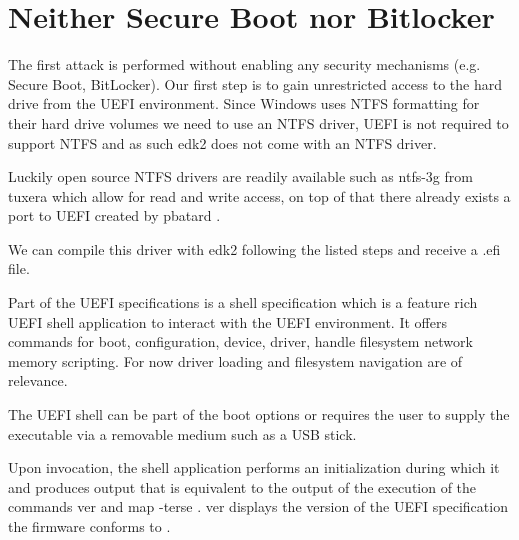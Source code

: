 
\section{Neither Secure Boot nor Bitlocker}
The first attack is performed without enabling any security mechanisms (e.g. Secure Boot, BitLocker). Our first step is to gain unrestricted access to the hard drive from the UEFI environment.
Since Windows uses NTFS formatting for their hard drive volumes we need to use an NTFS driver, UEFI is not required to support NTFS and as such edk2 does not come with an NTFS driver.

Luckily open source NTFS drivers are readily available such as ntfs-3g from tuxera \cite{ntfs-3g} which allow for read and write access, on top of that there already exists a port to UEFI created by pbatard \cite{ntfs-3g-uefi}.

We can compile this driver with edk2 following the listed steps and receive a .efi file.

Part of the UEFI specifications is a shell specification which is a feature rich UEFI shell application to interact with the UEFI environment.
It offers commands for
boot,
configuration,
device, driver, handle
filesystem
network
memory
scripting.
For now driver loading and filesystem navigation are of relevance.

The UEFI shell can be part of the boot options or requires the user to supply the executable via a removable medium such as a USB stick.

Upon invocation, the shell application performs an initialization during which it  and produces output that is equivalent to the output of the execution of the commands ver and map -terse \cite[3.3 Initialization]{uefi-shell}. ver displays the version of the UEFI specification the firmware conforms to \cite[5.3 Shell Commands]{uefi-shell}.

